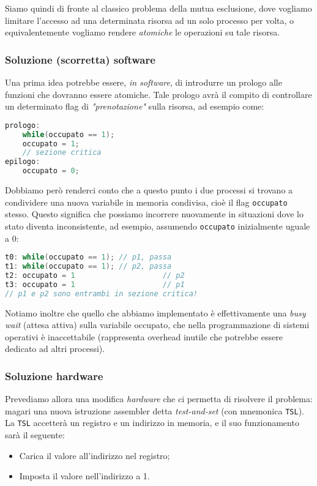 \documentclass[a4paper,11pt]{article}
\begin{document}
Siamo quindi di fronte al classico problema della mutua esclusione, dove vogliamo limitare l'accesso ad una determinata risorsa ad un solo processo per volta, o equivalentemente vogliamo rendere \textit{atomiche} le operazioni su tale risorsa.

\subsubsection{Soluzione (scorretta) software}
Una prima idea potrebbe essere, \textit{in software}, di introdurre un prologo alle funzioni che dovranno essere atomiche. Tale prologo avrà il compito di controllare un determinato flag di \textit{"prenotazione"} sulla risorsa, ad esempio come:
\begin{lstlisting}[language=C++, style=codestyle]	
prologo: 
	while(occupato == 1);
	occupato = 1;
	// sezione critica
epilogo: 
	occupato = 0;
\end{lstlisting}

Dobbiamo però renderci conto che a questo punto i due processi si trovano a condividere una nuova variabile in memoria condivisa, cioè il flag \lstinline|occupato| stesso.
Questo significa che possiamo incorrere nuovamente in situazioni dove lo stato diventa inconsistente, ad esempio, assumendo \lstinline|occupato| inizialmente uguale a 0:
\begin{lstlisting}[language=C++, style=codestyle]	
t0: while(occupato == 1); // p1, passa
t1: while(occupato == 1); // p2, passa
t2: occupato = 1					// p2
t3: occupato = 1					// p1
// p1 e p2 sono entrambi in sezione critica!
\end{lstlisting}

Notiamo inoltre che quello che abbiamo implementato è effettivamente una \textit{busy wait} (attesa attiva) sulla variabile occupato, che nella programmazione di sistemi operativi è inaccettabile (rappresenta overhead inutile che potrebbe essere dedicato ad altri processi).

\subsubsection{Soluzione hardware}
Prevediamo allora una modifica \textit{hardware} che ci permetta di risolvere il problema: magari una nuova istruzione assembler detta \textit{test-and-set} (con mnemonica \lstinline|TSL|).
La \lstinline|TSL| accetterà un registro e un indirizzo in memoria, e il suo funzionamento sarà il seguente:
\begin{itemize}
	\item Carica il valore all'indirizzo nel registro;
	\item Imposta il valore nell'indirizzo a 1.
\end{itemize}
\end{document}
